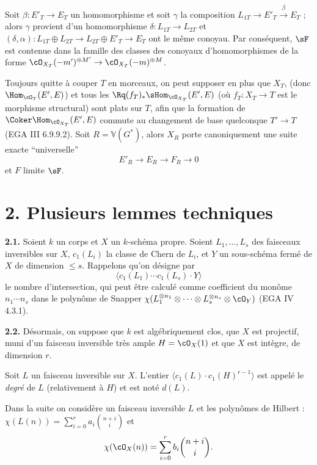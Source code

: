 Soit $\beta : E'_T \to E_T$ un homomorphisme et soit $\gamma$ la composition $L_{1T} \to E'_T \xrightarrow{\beta} E_T$ ; alors $\gamma$ provient d'un homomorphisme $\delta : L_{1T} \to L_{2T}$ et $(\delta, \alpha) : L_{1T} \oplus L_{2T} \to L_{2T} \oplus E'_T \to E_T$ ont le même conoyau. Par conséquent, $\sF$ est contenue dans la famille des classes des conoyaux d'homomorphismes de la forme $\cO_{X_T}(-m')^{\oplus M'} \to \cO_{X_T}(-m)^{\oplus M}$.

Toujours quitte à couper $T$ en morceaux, on peut supposer en plus que $X_T$, (donc $\Hom_{\cO_T}(E',E)$) et tous les $\Rq (f_T)_* \sHom_{\cO_{X_T}}(E', E)$ (où $f_T : X_T \to T$ est le morphisme structural) sont plats sur $T$, afin que la formation de $\Coker \Hom_{\cO_{X_T}}(E', E)$ commute au changement de base quelconque $T' \to T$ (EGA III 6.9.9.2). Soit $R = \mathbb{V}(G^*)$, alors $X_R$ porte canoniquement une suite exacte ``universelle''
\[
E'_R \to E_R \to F_R \to 0
\]
et $F$ limite $\sF$.

\section*{2. Plusieurs lemmes techniques}

\smallskip
\noindent\textbf{2.1.} Soient $k$ un corps et $X$ un $k$-schéma propre. Soient $L_1, \ldots, L_s$ des faisceaux inversibles sur $X$, $c_1(L_i)$ la classe de Chern de $L_i$, et $Y$ un sous-schéma fermé de $X$ de dimension $\leq s$. Rappelons qu'on désigne par
\[
\langle c_1(L_1) \cdots c_1(L_s) \cdot Y \rangle
\]
le nombre d'intersection, qui peut être calculé comme coefficient du monôme $n_1 \cdots n_s$ dans le polynôme de Snapper $\chi(L_1^{\otimes n_1} \otimes \cdots \otimes L_s^{\otimes n_s} \otimes \cO_Y)$ (EGA IV 4.3.1).

\noindent\textbf{2.2.} Désormais, on suppose que $k$ est algébriquement clos, que $X$ est projectif, muni d'un faisceau inversible très ample $H = \cO_X(1)$ et que $X$ est intègre, de dimension $r$.

Soit $L$ un faisceau inversible sur $X$. L'entier $\langle c_1(L) \cdot c_1(H)^{r-1} \rangle$ est appelé le \emph{degré} de $L$ (relativement à $H$) et est noté $d(L)$.

Dans la suite on considère un faisceau inversible $L$ et les polynômes de Hilbert : $\chi(L(n)) = \sum_{i=0}^{r} a_i \binom{n+i}{i}$ et
\[
\chi(\cO_X(n)) = \sum_{i=0}^{r} b_i \binom{n+i}{i}.
\]


